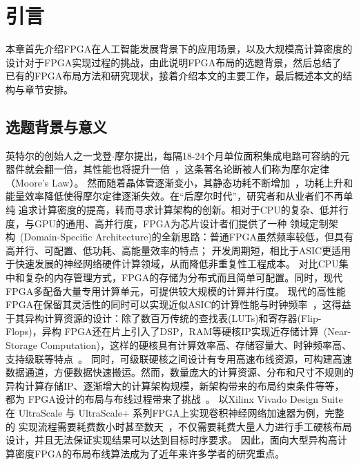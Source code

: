 \chapter{引言}

本章首先介绍FPGA在人工智能发展背景下的应用场景，以及大规模高计算密度的设计对于FPGA实现过程的挑战，由此说明FPGA布局的选题背景，然后总结了
已有的FPGA布局方法和研究现状，接着介绍本文的主要工作，最后概述本文的结构与章节安排。

\section{选题背景与意义}

英特尔的创始人之一戈登$\cdot$摩尔提出，每隔18-24个月单位面积集成电路可容纳的元器件就会翻一倍，其性能也将提升一倍~\cite{lundstrom2003moore}，这条著名论断被人们称为摩尔定律（Moore's Law）。
然而随着晶体管逐渐变小，其静态功耗不断增加~\cite{kim2003leakage}，功耗上升和能量效率降低使得摩尔定律逐渐失效。在“后摩尔时代”，研究者和从业者们不再单纯
追求计算密度的提高，转而寻求计算架构的创新。相对于CPU的复杂、低并行度，与GPU的通用、高并行度，FPGA为芯片设计者们提供了一种
领域定制架构~\cite{chung2010single}(Domain-Specific Architecture)的全新思路：普通FPGA虽然频率较低，但具有高并行、可配置、低功耗、高能量效率的特点；
开发周期短，相比于ASIC更适用于快速发展的神经网络硬件计算领域，从而降低非重复性工程成本。
对比CPU集中和复杂的内存管理方式，FPGA的存储为分布式而且简单可配置。同时，现代FPGA多配备大量专用计算单元，可提供较大规模的计算并行度。
现代的高性能FPGA在保留其灵活性的同时可以实现近似ASIC的计算性能与时钟频率~\cite{amara2006fpga}，这得益于其异构计算资源的设计：除了数百万传统的查找表(LUTs)和寄存器(Flip-Flops)，异构
FPGA还在片上引入了DSP，RAM等硬核IP实现近存储计算~\cite{singh2019near}(Near-Storage Computation)，这样的硬核具有计算效率高、存储容量大、时钟频率高、支持级联等特点~\cite{farooq2011exploration}。
同时，可级联硬核之间设计有专用高速布线资源，可构建高速数据通道，方便数据快速搬运。然而，数量庞大的计算资源、分布和尺寸不规则的异构计算存储IP、逐渐增大的计算架构规模，新架构带来的布局约束条件等等，都为
FPGA设计的布局与布线过程带来了挑战~\cite{farooq2011exploration}。
以Xilinx Vivado Design Suite 在 UltraScale 与 UltraScale+ 系列FPGA上实现卷积神经网络加速器为例，完整的
实现流程需要耗费数小时甚至数天~\cite{nachiket_stc_fpl2019}，不仅需要耗费大量人力进行手工硬核布局设计，并且无法保证实现结果可以达到目标时序要求。
因此，面向大型异构高计算密度FPGA的布局布线算法成为了近年来许多学者的研究重点。


